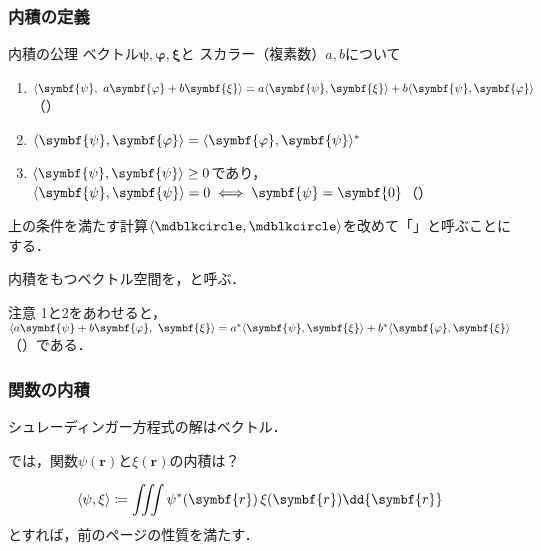 \documentclass[
    10pt,
    ]{sotsu-beamer}
\begin{document}
\begin{frame}
    \frametitle{内積の定義}


    \begin{block}{内積の公理}
        ベクトル$\symbf{\psi}, \symbf{\varphi}, \symbf{\xi}$と
        スカラー（複素数）$a, b$について
        \begin{enumerate}
            \item $\iparen{\symbf{\psi}, \  a\symbf{\varphi} + b\symbf{\xi}} = a\iparen{\symbf{\psi}, \symbf{\xi}} + b\iparen{\symbf{\psi}, \symbf{\varphi}}$（）
            \item $\iparen{\symbf{\psi}, \symbf{\varphi}} = \conj{\iparen{\symbf{\varphi}, \symbf{\psi}}}$
            \item $\iparen{\symbf{\psi}, \symbf{\psi}} \geq 0$であり，
                $\iparen{\symbf{\psi}, \symbf{\psi}} = 0 \iff \symbf{\psi} = \symbf{0}$（）
        \end{enumerate}
    \end{block}

    \pause

    上の条件を満たす計算$\iparen{\bigdot, \bigdot}$を改めて「」と呼ぶことにする．

    内積をもつベクトル空間を，と呼ぶ．

    \pause

    \begin{alertblock}{注意}
        1と2をあわせると，
        $\iparen{a\symbf{\psi} + b\symbf{\varphi}, \  \symbf{\xi}} = \conj{a}\iparen{\symbf{\psi}, \symbf{\xi}} + \conj{b}\iparen{\symbf{\varphi}, \symbf{\xi}}$（）である．
    \end{alertblock}


\end{frame}

\begin{frame}
    \frametitle{関数の内積}

    シュレーディンガー方程式の解はベクトル．

    では，関数$\psi(\symbf{r})$と$\xi(\symbf{r})$の内積は？

    \pause

    \begin{equation}
        \iparen{\psi, \xi}
            \coloneq \iiint \conj{\psi}(\symbf{r}) \, \xi(\symbf{r}) \dd{\symbf{r}}
    \end{equation}
    とすれば，前のページの性質を満たす．

\end{frame}
\end{document}
